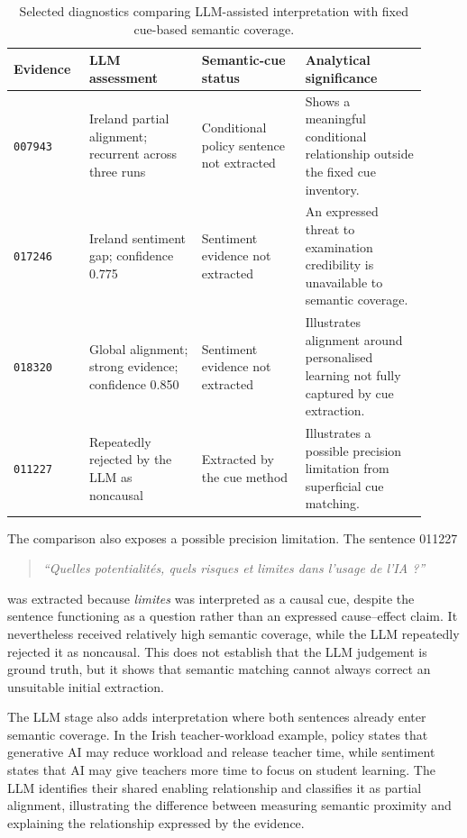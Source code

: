 \begin{table}[ht]
\centering
\footnotesize
\setlength{\tabcolsep}{3.5pt}
\begin{tabular}{
>{\raggedright\arraybackslash}p{0.16\linewidth}
>{\raggedright\arraybackslash}p{0.25\linewidth}
>{\raggedright\arraybackslash}p{0.23\linewidth}
>{\raggedright\arraybackslash}p{0.27\linewidth}}
\hline
Evidence & LLM assessment & Semantic-cue status & Analytical significance \\
\hline
\texttt{007943} &
Ireland partial alignment; recurrent across three runs &
Conditional policy sentence not extracted &
Shows a meaningful conditional relationship outside the fixed cue inventory. \\

\texttt{017246} &
Ireland sentiment gap; confidence 0.775 &
Sentiment evidence not extracted &
An expressed threat to examination credibility is unavailable to semantic coverage. \\

\texttt{018320} &
Global alignment; strong evidence; confidence 0.850 &
Sentiment evidence not extracted &
Illustrates alignment around personalised learning not fully captured by cue extraction. \\

\texttt{011227} &
Repeatedly rejected by the LLM as noncausal &
Extracted by the cue method &
Illustrates a possible precision limitation from superficial cue matching. \\
\hline
\end{tabular}
\caption{Selected diagnostics comparing LLM-assisted interpretation with fixed
cue-based semantic coverage.}
\label{tab:analysis-llm-cue-diagnostics}
\end{table}

The comparison also exposes a possible precision limitation. The sentence 011227
\begin{quote}
\textit{``Quelles potentialités, quels risques et limites dans l'usage de l'IA ?''}
\end{quote}
was extracted because \textit{limites} was interpreted as a causal cue, despite the
sentence functioning as a question rather than an expressed cause--effect claim. It
nevertheless received relatively high semantic coverage, while the LLM repeatedly
rejected it as noncausal. This does not establish that the LLM judgement is ground
truth, but it shows that semantic matching cannot always correct an unsuitable
initial extraction.

The LLM stage also adds interpretation where both sentences already enter semantic
coverage. In the Irish teacher-workload example, policy states that generative AI
may reduce workload and release teacher time, while sentiment states that AI may
give teachers more time to focus on student learning. The LLM identifies their
shared enabling relationship and classifies it as partial alignment, illustrating
the difference between measuring semantic proximity and explaining the relationship
expressed by the evidence.


